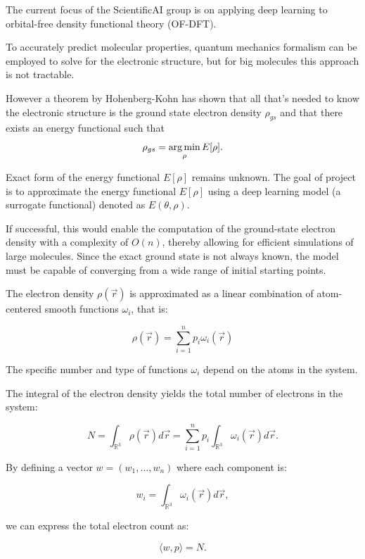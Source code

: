 \documentclass[a4paper,10pt]{report}
\begin{document}

The current focus of the ScientificAI group is on applying deep learning to orbital-free density functional theory (OF-DFT).

 To accurately predict molecular properties, quantum mechanics formalism can be employed to solve for the electronic structure, but for big molecules this approach is not tractable.

However a theorem by Hohenberg-Kohn has shown that all that's needed to know the electronic structure is the ground state electron density $\rho_{gs}$ and that there exists an energy functional such that
\begin{equation}
 \rho_{gs} = \operatorname*{arg\,min}_\rho E[\rho].
\end{equation}


Exact form of the energy functional $E[\rho]$ remains unknown. The goal of  project is to approximate the energy functional $E[\rho]$ using a deep learning model (a surrogate functional) denoted as $E(\theta, \rho)$.

If successful, this would enable the computation of the ground-state electron density with a complexity of $O(n)$, thereby allowing for efficient simulations of large molecules. Since the exact ground state is not always known, the model must be capable of converging from a wide range of initial starting points.

The electron density $\rho(\vec{r})$ is approximated as a linear combination of atom-centered smooth functions $\omega_i$, that is:

\[
\rho(\vec{r}) = \sum_{i=1}^n p_i \omega_i(\vec{r})
\]

The specific number and type of functions $\omega_i$ depend on the atoms in the system.

The integral of the electron density yields the total number of electrons in the system:

\[
N = \int_{\mathbb{R}^3} \rho(\vec{r}) d\vec{r} = \sum_{i=1}^n p_i \int_{\mathbb{R}^3} \omega_i(\vec{r}) d\vec{r}.
\]

By defining a vector $w = (w_1, \ldots, w_n)$ where each component is:

\[
w_i = \int_{\mathbb{R}^3} \omega_i(\vec{r}) d\vec{r},
\]

we can express the total electron count as:

\[
\langle w, p \rangle = N.
\]
\end{document}

